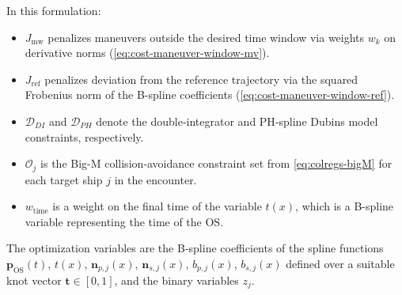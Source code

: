 In this formulation:
\begin{itemize}
    \item $J_{\mathrm{mw}}$ penalizes maneuvers outside the desired time window via weights $w_k$ on derivative norms (\cref{eq:cost-maneuver-window-mv}).
    \item $J_{\mathrm{ref}}$ penalizes deviation from the reference trajectory via the squared Frobenius norm of the B-spline coefficients (\cref{eq:cost-maneuver-window-ref}).
    \item $\mathcal{D}_{DI}$ and $\mathcal{D}_{PH}$ denote the double‐integrator and PH‐spline Dubins model constraints, respectively.
    \item $\mathcal{O}_j$ is the Big-M collision‐avoidance constraint set from \eqref{eq:colregs-bigM} for each target ship $j$ in the encounter.
    \item $w_\text{time}$ is a weight on the final time of the variable $t(x)$, which is a B-spline variable representing the time of the OS.
\end{itemize}
The optimization variables are the B-spline coefficients of the spline functions
$\mathbf{p}_\text{OS}(t)$, $t(x)$, $\mathbf{n}_{p,j}(x)$, $\mathbf{n}_{s,j}(x)$, $b_{p,j}(x)$, $b_{s,j}(x)$ defined over a suitable knot vector $\mathbf{t}\in[0,1]$, and the binary variables $z_j$.